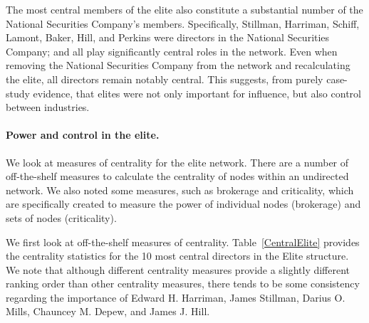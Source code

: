 \documentclass[11pt,fleqn]{article}
\begin{document}
The most central members of the elite also constitute a substantial number of the National Securities Company's members. Specifically, Stillman, Harriman, Schiff, Lamont, Baker, Hill, and Perkins were directors in the National Securities Company; and all play significantly central roles in the network. Even when removing the National Securities Company from the network and recalculating the elite, all directors remain notably central. This suggests, from purely case-study evidence, that elites were not only important for influence, but also control between industries.

\paragraph{Power and control in the elite.}

We look at measures of centrality for the elite network. There are a number of off-the-shelf measures to calculate the centrality of nodes within an undirected network. We also noted some measures, such as brokerage and criticality, which are specifically created to measure the power of individual nodes (brokerage) and sets of nodes (criticality).

We first look at off-the-shelf measures of centrality. Table~\ref{CentralElite} provides the centrality statistics for the 10 most central directors in the Elite structure. We note that although different centrality measures provide a slightly different ranking order than other centrality measures, there tends to be some consistency regarding the importance of Edward H. Harriman, James Stillman, Darius O. Mills, Chauncey M. Depew, and James J. Hill.
\end{document}
